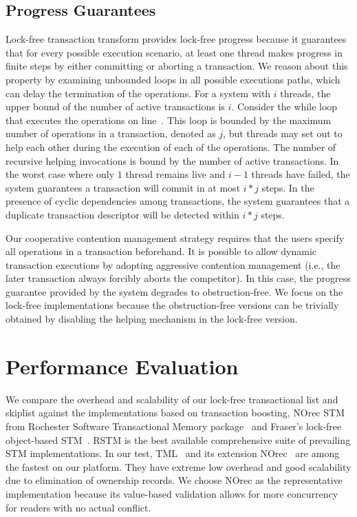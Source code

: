 \documentclass{sig-alternate-05-2015}
\begin{document}
\subsection{Progress Guarantees}
Lock-free transaction transform provides lock-free progress because it guarantees that for every possible execution scenario, at least one thread makes progress in finite steps by either committing or aborting a transaction.  
We reason about this property by examining unbounded loops in all possible executions paths, which can delay the termination of the operations.
For a system with $i$ threads, the upper bound of the number of active transactions is $i$.
Consider the while loop that executes the operations on line~.
This loop is bounded by the maximum number of operations in a transaction, denoted as $j$, but threads may set out to help each other during the execution of each of the operations.
The number of recursive helping invocations is bound by the number of active transactions. 
In the worst case where only $1$ thread remains live and $i-1$ threads have failed, the system guarantees a transaction will commit in at most $i * j$ steps.
In the presence of cyclic dependencies among transactions, the system guarantees that a duplicate transaction descriptor will be detected within $i * j$ steps.

Our cooperative contention management strategy requires that the users specify all operations in a transaction beforehand.
It is possible to allow dynamic transaction executions by adopting aggressive contention management (i.e., the later transaction always forcibly aborts the competitor).
In this case, the progress guarantee provided by the system degrades to obstruction-free.
We focus on the lock-free implementations because the obstruction-free versions can be trivially obtained by disabling the helping mechanism in the lock-free version.

\section{Performance Evaluation}
\label{sec:experiment}
We compare the overhead and scalability of our lock-free transactional list and skiplist against the implementations based on transaction boosting, NOrec STM from Rochester Software Transactional Memory package~\cite{marathe2006lowering} and Fraser's lock-free object-based STM~\cite{fraser2004practical}.
RSTM is the best available comprehensive suite of prevailing STM implementations.
In our test, TML~\cite{dalessandro2010norec} and its extension NOrec~\cite{dalessandro2010norec} are among the fastest on our platform.
They have extreme low overhead and good scalability due to elimination of ownership records.
We choose NOrec as the representative implementation because its value-based validation allows for more concurrency for readers with no actual conflict.
\end{document}
